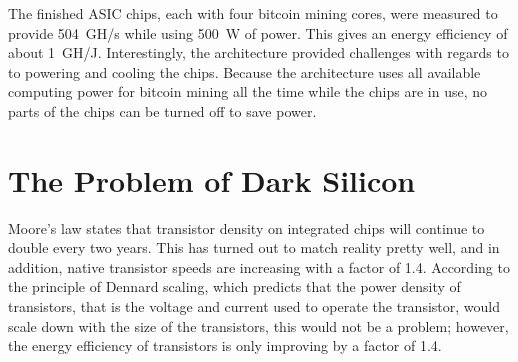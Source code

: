 The finished ASIC chips, each with four bitcoin mining cores, were measured to provide 504~GH/s while using
500~W of power. This gives an energy efficiency of about 1~GH/J.
Interestingly, the architecture provided challenges with regards to to powering and cooling the chips.
Because the architecture uses all available computing power for bitcoin mining all the time while
the chips are in use, no parts of the chips can be turned off to save power. \cite{goldstrike}


%
%
%


\section{The Problem of Dark Silicon}
\label{sec:dark-silicon}

Moore's law states that transistor density on integrated chips will continue to double every
two years. This has turned out to match reality pretty well, and in addition, native transistor speeds are increasing with a factor of 1.4.
According to the principle of Dennard scaling, which predicts that the power density of transistors, that
is the voltage and current used to operate the transistor, would scale down with the
size of the transistors, this would not be a problem; however, the energy efficiency
of transistors is only improving by a factor of 1.4.

